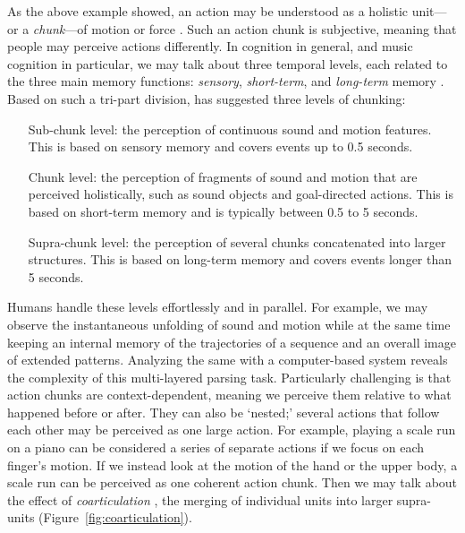 As the above example showed, an action may be understood as a holistic unit---or a \emph{chunk}---of motion or force \citep{buxton_chunking_1986}. Such an action chunk is subjective, meaning that people may perceive actions differently. In cognition in general, and music cognition in particular, we may talk about three temporal levels, each related to the three main memory functions: \emph{sensory}, \emph{short-term}, and \emph{long-term} memory \citep{snyder_music_2000}. Based on such a tri-part division, \citet{godoy_reflections_2008} has suggested three levels of chunking:

\begin{itemize}
	\item[Sub-chunk level:] the perception of continuous sound and motion features. This is based on sensory memory and covers events up to 0.5 seconds.
	\item[Chunk level:] the perception of fragments of sound and motion that are perceived holistically, such as sound objects and goal-directed actions. This is based on short-term memory and is typically between 0.5 to 5 seconds.
	\item[Supra-chunk level:] the perception of several chunks concatenated into larger structures. This is based on long-term memory and covers events longer than 5 seconds.
\end{itemize}

Humans handle these levels effortlessly and in parallel. For example, we may observe the instantaneous unfolding of sound and motion while at the same time keeping an internal memory of the trajectories of a sequence and an overall image of extended patterns. Analyzing the same with a computer-based system reveals the complexity of this multi-layered parsing task.
Particularly challenging is that action chunks are context-dependent, meaning we perceive them relative to what happened before or after. They can also be `nested;' several actions that follow each other may be perceived as one large action. For example, playing a scale run on a piano can be considered a series of separate actions if we focus on each finger's motion. If we instead look at the motion of the hand or the upper body, a scale run can be perceived as one coherent action chunk. Then we may talk about the effect of \emph{coarticulation} \citep{hardcastle_coarticulation_1999}, the merging of individual units into larger supra-units (Figure~\ref{fig:coarticulation}).

